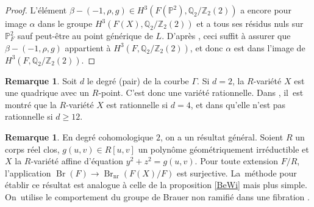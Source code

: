 \documentclass[11pt]{article}
\theoremstyle{definition}
\newtheorem{rmk}[thm]{Remarque}
\newcommand{\Q}{\mathbb Q}
\newcommand{\Z}{\mathbb Z}
\renewcommand{\P}{\mathbb P}
\newcommand{\Br}{\operatorname{Br}}
\newcommand{\on}[1]{\operatorname{#1}}
\begin{document}
\begin{proof}
L'élément $\beta - (-1,\rho, g) \in H^3(F(\P^2),\Q_2/\Z_2(2))$ a encore pour image $\alpha$
dans le groupe $H^3(F(X),\Q_2/\Z_2(2))$ et a tous ses résidus nuls sur $\P^2_{F}$
sauf peut-être au point générique de $L$. D'après \cite[Prop.\,8.6, Rem.\,1.11, Rem.\,2.5]{rost1996chow}, ceci suffit à assurer
que $\beta - (-1,\rho, g)$ appartient à $H^3(F,\Q_2/\Z_2(2))$, et donc
$\alpha$ est dans l'image de $H^3(F,\Q_2/\Z_2(2))$.
\end{proof}

\begin{rmk}
Soit $d$ le degré (pair) de la courbe $\Gamma$. Si $d=2$, la $R$-variété $X$ est une quadrique avec un $R$-point. C'est donc une variété rationnelle. Dans \cite[Th.\,2.2]{benoist2026rationality}, il~est montré que la $R$-variété $X$
est rationnelle si $d=4$, et dans \cite[Th.\,4.5]{benoist2026rationality} qu'elle n'est pas rationnelle si $d\geq 12$.
\end{rmk}

\begin{rmk} En degré cohomologique $2$, on a un résultat général.
Soient $R$ un corps réel clos, $g(u,v) \in R[u,v]$ un polynôme
géométriquement irréductible et $X$ la $R$-variété affine d'équation $y^2+z^2=g(u,v)$. Pour toute extension $F/R$, l'application $\Br(F) \to \Br_{\on{nr}}(F(X)/F)$ est surjective. La~méthode pour établir ce résultat est analogue à celle de la proposition \ref{BeWi} mais plus simple. On~utilise le comportement du groupe de Brauer non ramifié dans une fibration \cite[Ch.\,11]{colliot2021brauer}.
\end{rmk}


\end{document}
